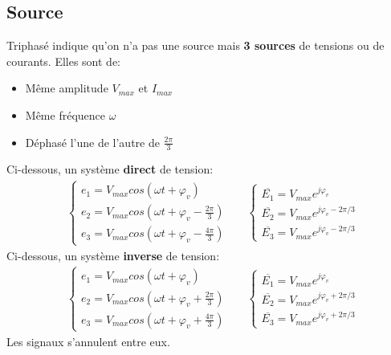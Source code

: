 \documentclass{report}
\begin{document}
\subsection{Source}
Triphasé indique qu'on n'a pas une source mais \textbf{3 sources} de tensions ou de courants. Elles sont de:
\begin{itemize}
\item Même amplitude $V_{max}$ et $I_{max}$
\item Même fréquence $\omega$
\item Déphasé l'une de l'autre de $\frac{2\pi}{3}$
\end{itemize}
Ci-dessous, un système \textbf{direct} de tension:
\begin{align*}
&\begin{cases}
e_1 = V_{max} cos(\omega t + \varphi_v)\\
e_2 = V_{max} cos(\omega t + \varphi_v - \frac{2\pi}{3})\\
e_3 = V_{max} cos(\omega t + \varphi_v - \frac{4 \pi}{3})
\end{cases} & &\begin{cases}
\overline{E_1} = V_{max}e^{j \varphi_v}\\
\overline{E_2} = V_{max}e^{j \varphi_v - 2 \pi /3}\\
\overline{E_3} = V_{max}e^{j \varphi_v - 2 \pi /3}
\end{cases}
\end{align*}
Ci-dessous, un système \textbf{inverse} de tension:
\begin{align*}
&\begin{cases}
e_1 = V_{max} cos(\omega t + \varphi_v)\\
e_2 = V_{max} cos(\omega t + \varphi_v + \frac{2\pi}{3})\\
e_3 = V_{max} cos(\omega t + \varphi_v + \frac{4 \pi}{3})
\end{cases} & &\begin{cases}
\overline{E_1} = V_{max}e^{j \varphi_v}\\
\overline{E_2} = V_{max}e^{j \varphi_v + 2 \pi /3}\\
\overline{E_3} = V_{max}e^{j \varphi_v + 2 \pi /3}
\end{cases}
\end{align*}
Les signaux s'annulent entre eux.
\end{document}
